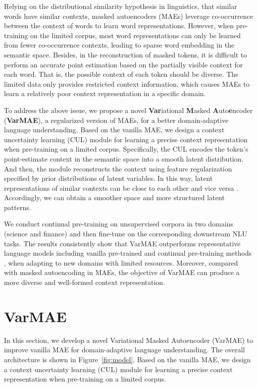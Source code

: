 \documentclass[11pt]{article}
\begin{document}
Relying on the distributional similarity hypothesis \cite{DBLP:journals/corr/abs-1301-3781}
in linguistics, 
that similar words have similar contexts, 
masked autoencoders (MAEs) leverage co-occurrence between the context of words to learn word representations.
However, when pre-training on the limited corpus, most word representations can only be learned from fewer co-occurrence contexts, leading to sparse word embedding in the semantic space.
Besides, in the reconstruction of masked tokens, it is difficult to perform an accurate point estimation \cite{DBLP:conf/emnlp/LiGLPLZG20}  based on the partially visible context for each word.
That is, the possible context of each token should be diverse.
The limited data only provides restricted context information, which causes MAEs to learn a relatively poor context representation in a specific domain.


To address the above issue, we propose a novel \textbf{Var}iational \textbf{M}asked \textbf{A}uto\textbf{e}ncoder (\textbf{VarMAE}), a regularized version of MAEs, for a better domain-adaptive language understanding. 
Based on the vanilla MAE, we design a context uncertainty learning (CUL) module for learning a precise context representation when pre-training on a
limited corpus.
Specifically, the CUL encodes the token's point-estimate context in the semantic space into a smooth latent distribution.
And then, the module reconstructs the context using feature regularization specified by prior distributions of latent variables.
In this way, latent representations of similar contexts can be close to each other and vice versa \cite{DBLP:conf/emnlp/LiHNBY19}.
Accordingly, we can obtain a smoother space and more structured latent patterns.


We conduct continual pre-training on unsupervised corpora in two domains (science and finance) and then fine-tune on the corresponding downstream NLU tasks.
The results consistently show that VarMAE outperforms representative language models including vanilla pre-trained \cite{DBLP:journals/corr/abs-1907-11692} and continual pre-training methods \cite{DBLP:conf/acl/GururanganMSLBD20}, when adapting to new domains with limited resources.
Moreover, compared with masked autoencoding in MAEs, the objective of VarMAE can produce a more diverse and well-formed context representation.

\section{VarMAE}
In this section, we develop a novel Variational Masked Autoencoder (VarMAE) to improve vanilla MAE for domain-adaptive language understanding. The overall architecture is shown in Figure~\ref{fig:model}. Based on the vanilla MAE, we design a context uncertainty learning (CUL) module for learning a precise context representation when pre-training on a limited corpus.
\end{document}
